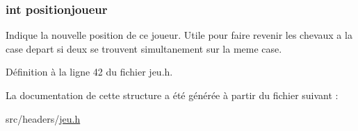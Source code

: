 \hypertarget{structstruct__pendantjeu_a886601c5a72273d41b31c90740071a61}{
\subsubsection[{positionjoueur}]{\setlength{\rightskip}{0pt plus 5cm}int positionjoueur}}\label{structstruct__pendantjeu_a886601c5a72273d41b31c90740071a61}
Indique la nouvelle position de ce joueur. Utile pour faire revenir les chevaux a la case depart si deux se trouvent simultanement sur la meme case. 

Définition à la ligne 42 du fichier jeu.\-h.



La documentation de cette structure a été générée à partir du fichier suivant \-:\begin{DoxyCompactItemize}
\item 
src/headers/\hyperlink{jeu_8h}{jeu.\-h}\end{DoxyCompactItemize}
